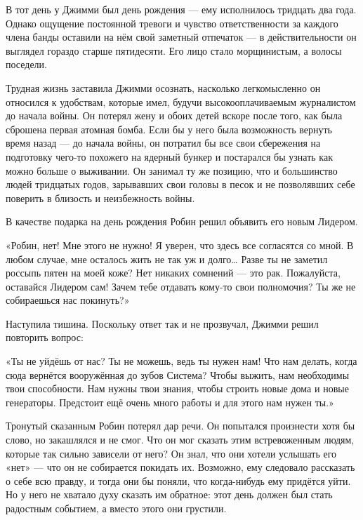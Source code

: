 \documentclass[a4paper,12pt]{book}
\begin{document}
\par
В тот день у Джимми был день рождения — ему исполнилось тридцать два года. Однако ощущение постоянной тревоги и чувство ответственности за каждого члена банды оставили на нём свой заметный отпечаток — в действительности он выглядел гораздо старше пятидесяти. Его лицо стало морщинистым, а волосы поседели.
\par
Трудная жизнь заставила Джимми осознать, насколько легкомысленно он относился к удобствам, которые имел, будучи высокооплачиваемым журналистом до начала войны. Он потерял жену и обоих детей вскоре после того, как была сброшена первая атомная бомба. Если бы у него была возможность вернуть время назад — до начала войны, он потратил бы все свои сбережения на подготовку чего-то похожего на ядерный бункер и постарался бы узнать как можно больше о выживании. Он занимал ту же позицию, что и большинство людей тридцатых годов, зарывавших свои головы в песок и не позволявших себе поверить в близость и неизбежность войны.
\par
В качестве подарка на день рождения Робин решил объявить его новым Лидером.\\
\par
«Робин, нет! Мне этого не нужно! Я уверен, что здесь все согласятся со мной. В любом случае, мне осталось жить не так уж и долго… Разве ты не заметил россыпь пятен на моей коже? Нет никаких сомнений — это рак. Пожалуйста, оставайся Лидером сам! Зачем тебе отдавать кому-то свои полномочия? Ты же не собираешься нас покинуть?»
\par
Наступила тишина. Поскольку ответ так и не прозвучал, Джимми решил повторить вопрос:
\par
«Ты не уйдёшь от нас? Ты не можешь, ведь ты нужен нам! Что нам делать, когда сюда вернётся вооружённая до зубов Система? Чтобы выжить, нам необходимы твои способности. Нам нужны твои знания, чтобы строить новые дома и новые генераторы. Предстоит ещё очень много работы и для этого нам нужен ты.»
\par
Тронутый сказанным Робин потерял дар речи. Он попытался произнести хотя бы слово, но закашлялся и не смог. Что он мог сказать этим встревоженным людям, которые так сильно зависели от него? Он знал, что они хотели услышать его «нет» — что он не собирается покидать их. Возможно, ему следовало рассказать о себе всю правду, и тогда они бы поняли, что когда-нибудь ему придётся уйти. Но у него не хватало духу сказать им обратное: этот день должен был стать радостным событием, а вместо этого они грустили.
\par
\end{document}
